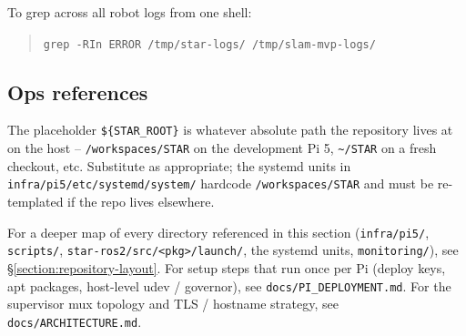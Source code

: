 To grep across all robot logs from one shell:

\begin{quote}\small
\texttt{grep -RIn ERROR /tmp/star-logs/ /tmp/slam-mvp-logs/}
\end{quote}

\subsection{Ops references}

The placeholder \texttt{\$\{STAR\_ROOT\}} is whatever absolute path
the repository lives at on the host -- \texttt{/workspaces/STAR} on
the development Pi 5, \texttt{\textasciitilde/STAR} on a fresh
checkout, etc. Substitute as appropriate; the systemd units in
\texttt{infra/pi5/etc/systemd/system/} hardcode
\texttt{/workspaces/STAR} and must be re-templated if the repo lives
elsewhere.

For a deeper map of every directory referenced in this section
(\texttt{infra/pi5/}, \texttt{scripts/}, \texttt{star-ros2/src/<pkg>/launch/},
the systemd units, \texttt{monitoring/}), see
\S\ref{section:repository-layout}. For setup steps that run once per
Pi (deploy keys, apt packages, host-level udev / governor), see
\texttt{docs/PI\_DEPLOYMENT.md}. For the supervisor mux topology and
TLS / hostname strategy, see \texttt{docs/ARCHITECTURE.md}.
